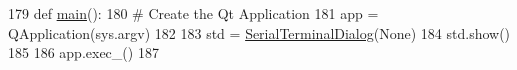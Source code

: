 \begin{DoxyCode}
179 \textcolor{keyword}{def }\hyperlink{namespacesoftware_1_1chipwhisperer_1_1capture_1_1utils_1_1SerialTerminalDialog_aa64752c18c35a6cbee8a910c36199454}{main}():
180     \textcolor{comment}{# Create the Qt Application}
181     app = QApplication(sys.argv)
182 
183     std = \hyperlink{classsoftware_1_1chipwhisperer_1_1capture_1_1utils_1_1SerialTerminalDialog_1_1SerialTerminalDialog}{SerialTerminalDialog}(\textcolor{keywordtype}{None})
184     std.show()
185 
186     app.exec\_()
187 
\end{DoxyCode}
